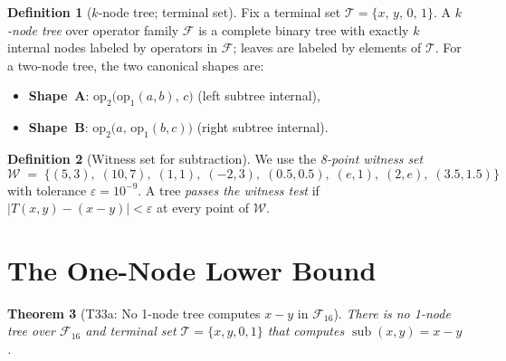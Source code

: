 \documentclass[12pt,a4paper]{article}
\newtheorem{theorem}{Theorem}[section]
\theoremstyle{definition}
\newtheorem{definition}[theorem]{Definition}
\newcommand{\sub}{\operatorname{sub}}
\begin{document}
\begin{definition}[$k$-node tree; terminal set]\label{def:tree}
Fix a terminal set $\mathcal{T} = \{x,\,y,\,0,\,1\}$.
A \emph{$k$-node tree} over operator family $\mathcal{F}$ is a complete
binary tree with exactly $k$ internal nodes labeled by operators in
$\mathcal{F}$; leaves are labeled by elements of $\mathcal{T}$.
For a two-node tree, the two canonical shapes are:
\begin{itemize}
  \item \textbf{Shape~A}: $\mathrm{op}_2\!\bigl(\mathrm{op}_1(a,b),\,c\bigr)$
        \quad (left subtree internal),
  \item \textbf{Shape~B}: $\mathrm{op}_2\!\bigl(a,\,\mathrm{op}_1(b,c)\bigr)$
        \quad (right subtree internal).
\end{itemize}
\end{definition}

\begin{definition}[Witness set for subtraction]\label{def:witness}
We use the \emph{8-point witness set}
\[
  \mathcal{W} \;=\;
  \{(5,3),\;(10,7),\;(1,1),\;(-2,3),\;(0.5,0.5),\;(e,1),\;(2,e),\;(3.5,1.5)\}
\]
with tolerance $\varepsilon=10^{-9}$.  A tree \emph{passes the witness test}
if $|T(x,y)-(x-y)|<\varepsilon$ at every point of $\mathcal{W}$.
\end{definition}

\section{The One-Node Lower Bound}

\begin{theorem}[T33a: No 1-node tree computes $x-y$ in $\mathcal{F}_{16}$]
\label{thm:lower1}
There is no 1-node tree over $\mathcal{F}_{16}$ and terminal set
$\mathcal{T}=\{x,y,0,1\}$ that computes $\sub(x,y)=x-y$.
\end{theorem}
\end{document}
